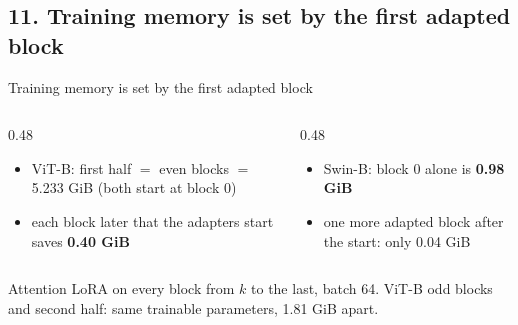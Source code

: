 \documentclass[aspectratio=169,11pt]{beamer}
\newcommand{\figH}{5.0cm}
\newcommand{\src}[1]{\par\vfill{\tiny\color{cGrey}#1\par}}
\begin{document}
\subsection{11. Training memory is set by the first adapted block}
\begin{frame}{Training memory is set by the first adapted block}
\vspace{-1mm}
{\renewcommand{\figH}{4.4cm}\centering\par}
\vspace{-1mm}
\begin{columns}[T]
\begin{column}{0.48\textwidth}
\footnotesize
\begin{itemize}
  \item ViT-B: first half $=$ even blocks $=$ 5.233 GiB (both start at block 0)
  \item each block later that the adapters start saves \textbf{0.40 GiB}
\end{itemize}
\end{column}
\begin{column}{0.48\textwidth}
\footnotesize
\begin{itemize}
  \item Swin-B: block 0 alone is \textbf{0.98 GiB}
  \item one more adapted block after the start: only 0.04 GiB
\end{itemize}
\end{column}
\end{columns}
\src{Attention LoRA on every block from $k$ to the last, batch 64. ViT-B odd blocks and second half: same trainable parameters, 1.81 GiB apart.}
\end{frame}

\end{document}
